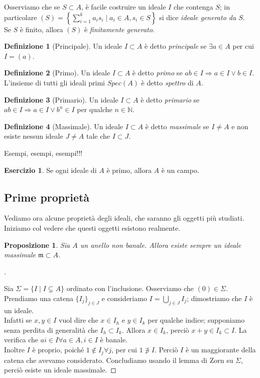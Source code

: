 \documentclass[a4paper,10pt]{article}
\theoremstyle{plain}
\newtheorem{prop}[thm]{Proposizione}
\theoremstyle{definition}
\newtheorem{defn}{Definizione}[section]
\newtheorem{es}{Esercizio}[section]
\newenvironment{myproof}[1][\proofname]{%
  \begin{proof}[#1]$ $\par\nobreak\ignorespaces
}{%
  \qedhere
  \end{proof}
}
\newcommand{\m}{\mathfrak{m}}
\newcommand{\N}{\mathbb{N}}
\begin{document}
Osserviamo che se $S\subset A$, è facile costruire un ideale $I$ che contenga $S$; in particolare $\displaystyle (S)=\left\{ \sum_{i=1}^k a_i s_i \mid a_i\in A, s_i\in S \right\}$ si dice \textit{ideale generato da $S$}.\\
Se $S$ è finito, allora $(S)$ è \textit{finitamente generato}.\\

\begin{defn}[Principale]
    Un ideale $I\subset A$ è detto \textit{principale} se $\exists a\in A$ per cui $I=(a)$.
\end{defn}
\begin{defn}[Primo]
    Un ideale $I\subset A$ è detto \textit{primo} se $ab\in I\Longrightarrow a\in I \lor b\in I$.\\
    L'insieme di tutti gli ideali primi $Spec(A)$ è detto \textit{spettro} di $A$.
\end{defn}
\begin{defn}[Primario]
    Un ideale $I\subset A$ è detto \textit{primario} se $ab\in I\Longrightarrow a\in I \lor b^n\in I$ per qualche $n\in\N$.
\end{defn}
\begin{defn}[Massimale]
    Un ideale $I\subset A$ è detto \textit{massimale} se $I\neq A$ e non esiste nessun ideale $J\neq A$ tale che $I\subset J$.
\end{defn}


Esempi, esempi, esempi!!!\\

\begin{es}
    Se ogni ideale di $A$ è primo, allora $A$ è un campo.
\end{es}

\subsection{Prime proprietà}
Vediamo ora alcune proprietà degli ideali, che saranno gli oggetti più studiati.\\
Iniziamo col vedere che questi oggetti esistono realmente.

\begin{prop}
    Sia $A$ un anello non banale. Allora esiste sempre un ideale massimale $\m\subset A$.
\end{prop}
\begin{myproof}
    Sia $\Sigma=\{ I \mid I\subsetneq A\}$ ordinato con l'inclusione. Osserviamo che $(0)\in\Sigma$.\\
    Prendiamo una catena $\{I_j\}_{j\in J}$ e consideriamo $I=\bigcup_{j\in J}I_j$; dimostriamo che $I$ è un ideale.\\
    Infatti se $x,y\in I$ vuol dire che $x\in I_h$ e $y\in I_k$ per qualche indice; supponiamo senza perdita di generalità che $I_h\subset I_k$. Allora $x\in I_k$, perciò $x+y\in I_k\subset I$. La verifica che $ai\in I\forall a\in A,i\in I$ è banale.\\
    Inoltre $I$ è proprio, poiché $1\not\in I_j\forall j$, per cui $1\not\ni I$. Perciò $I$ è un maggiorante della catena che avevamo considerato.
    Concludiamo usando il lemma di Zorn su $\Sigma$, perciò esiste un ideale massimale.
\end{myproof}
\end{document}
